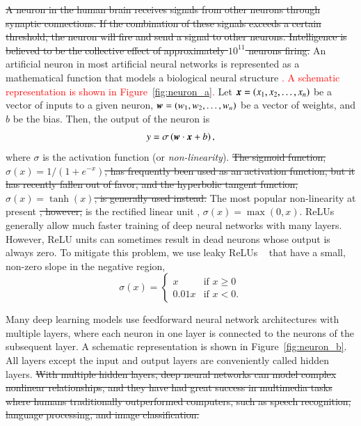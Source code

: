 \documentclass[fleqn,usenatbib]{mnras}
\newcommand{\changed}[1]{\textcolor{red}{#1}}
\begin{document}
\sout{ A neuron in the human brain receives signals from other neurons through synaptic connections.  If the combination of these signals exceeds a certain threshold, the neuron will fire and send a signal to other neurons.  Intelligence is believed to be the collective effect of approximately $10^{11}$ neurons firing.  }
An artificial neuron in most artificial neural networks is represented
as a mathematical function that models a biological neural structure
\changed{
\citep{aggarwal2014data}.
A schematic representation is shown in Figure~\ref{fig:neuron_a}.
}
Let $\bmath{x}=\left(x_1,x_2,\dots,x_n\right)$ be a vector of inputs to a given neuron,
$\bmath{w}=\left(w_1,w_2,\dots,w_n\right)$ be a vector of weights, and
$b$ be the bias.
Then, the output of the neuron is
\begin{equation}
  y = \sigma \left( \bmath{w} \cdot \bmath{x} + b \right),
  \label{eq:neuron_output}
\end{equation}
where $\sigma$ is the activation function (or \textit{non-linearity}).
\sout{ The sigmoid function, $\sigma(x)=1/\left(1+e^{-x}\right)$, has frequently been used as an activation function, but it has recently fallen out of favor, and the hyperbolic tangent function, $\sigma(x)=\tanh(x)$, is generally used instead.  }
The most popular non-linearity at present
\sout{, however, }
is the rectified linear unit
\citep[ReLU;][]{nair2010rectified}, $\sigma(x)=\max(0, x)$.
ReLUs generally allow much faster
training of deep neural networks with many layers.
However, ReLU units can sometimes result in dead neurons whose output is always zero.
To mitigate this problem, we use leaky ReLUs
\changed{
~\citep{maas2013rectifier}
}
that have a small, non-zero slope in the negative region,
\begin{equation}
  \sigma(x) =
    \begin{cases}
      x & \mbox{if } x \geq 0 \\
      0.01x & \mbox{if } x < 0.
    \end{cases}
\end{equation}

Many deep learning models use feedforward neural network architectures with multiple layers,
where each neuron in one layer is connected to the neurons of the subsequent layer.
A schematic representation is shown in Figure~\ref{fig:neuron_b}.
All layers except the input and output layers are conveniently called hidden layers.
\sout{ With multiple hidden layers, deep neural networks can model complex nonlinear relationships, and they have had great success in multimedia tasks where humans traditionally outperformed computers, such as speech recognition, language processing, and image classification.  }
\end{document}

